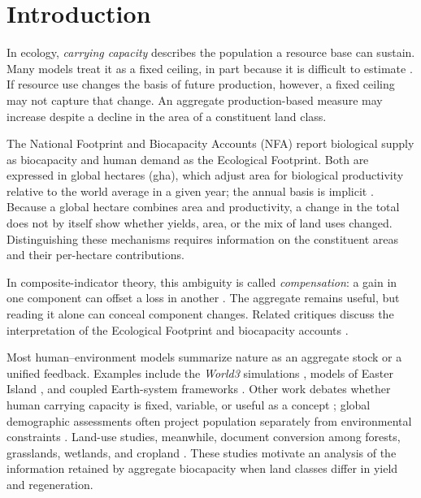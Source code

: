 \documentclass[preprint,12pt,authoryear]{elsarticle}
\begin{document}
\section{Introduction}\label{sec:intro}

In ecology, \emph{carrying capacity} describes the population a resource base can sustain. Many models treat it as a fixed ceiling, in part because it is difficult to estimate \citep{Cohen1995}. If resource use changes the basis of future production, however, a fixed ceiling may not capture that change. An aggregate production-based measure may increase despite a decline in the area of a constituent land class.

The National Footprint and Biocapacity Accounts (NFA) report biological supply as biocapacity and human demand as the Ecological Footprint. Both are expressed in global hectares (gha), which adjust area for biological productivity relative to the world average in a given year; the annual basis is implicit \citep{GFNStandards2009,GFNGuidebook2019}. Because a global hectare combines area and productivity, a change in the total does not by itself show whether yields, area, or the mix of land uses changed. Distinguishing these mechanisms requires information on the constituent areas and their per-hectare contributions.

In composite-indicator theory, this ambiguity is called \emph{compensation}: a gain in one component can offset a loss in another \citep{Nardo2008,Becker2017,Fischer2022}. The aggregate remains useful, but reading it alone can conceal component changes. Related critiques discuss the interpretation of the Ecological Footprint and biocapacity accounts \citep{Blomqvist2013,GiampietroSaltelli2014,vdBerghGrazi2015,Galli2016}.

Most human--environment models summarize nature as an aggregate stock or a unified feedback. Examples include the \emph{World3} simulations \citep{Meadows1972,Meadows1974,Meadows2004}, models of Easter Island \citep{BranderTaylor1998,Anderies2000}, and coupled Earth-system frameworks \citep{Motesharrei2016,Donges2017,CalvinBondLamberty2018,HendersonLoreau2018}. Other work debates whether human carrying capacity is fixed, variable, or useful as a concept \citep{Cohen1995,vdBerghRietveld2004,Simon1996,Meyer1994,MeyerAusubel1999,Dasgupta2021}; global demographic assessments often project population separately from environmental constraints \citep{UN2022}. Land-use studies, meanwhile, document conversion among forests, grasslands, wetlands, and cropland \citep{Haberl2007,Krausmann2013,Erb2017}. These studies motivate an analysis of the information retained by aggregate biocapacity when land classes differ in yield and regeneration.
\end{document}
